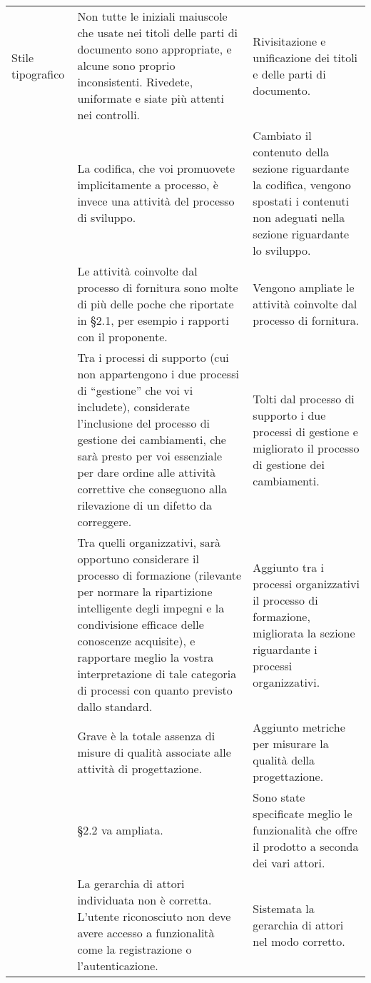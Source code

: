 {\begin{longtable}{ C{2.2cm} C{6cm} C{6cm}}
		Stile tipografico & Non tutte le iniziali maiuscole che usate nei titoli delle parti di documento sono appropriate, e alcune sono proprio inconsistenti. Rivedete, uniformate e siate più attenti nei controlli. & Rivisitazione e unificazione dei titoli e delle parti di documento. \\
		
		\NdP & La codifica, che voi promuovete implicitamente a processo, è invece una attività del processo di sviluppo. & Cambiato il contenuto della sezione riguardante la codifica, vengono spostati i contenuti non adeguati nella sezione riguardante lo sviluppo.\\
		
		\NdP & Le attività coinvolte dal processo di fornitura sono molte di più delle
		poche che riportate in §2.1, per esempio i rapporti con il proponente.& Vengono ampliate le attività coinvolte dal processo di fornitura.\\
		
		\NdP & Tra i processi di supporto (cui non appartengono i due processi di “gestione” che voi vi includete), considerate l’inclusione del processo di gestione dei cambiamenti, che sarà presto per voi essenziale per dare ordine alle attività correttive che conseguono alla rilevazione di un difetto da correggere.& Tolti dal processo di supporto i due processi di gestione e migliorato il processo di gestione dei cambiamenti. \\ 
		
		\NdP & Tra quelli organizzativi, sarà opportuno considerare il processo di formazione (rilevante per normare la ripartizione intelligente degli impegni e la condivisione efficace delle conoscenze acquisite), e rapportare meglio la vostra interpretazione di tale categoria di processi con quanto previsto dallo standard. & Aggiunto tra i processi organizzativi il processo di formazione, migliorata la sezione riguardante i processi organizzativi.\\
		
		\NdP & Grave è la totale assenza di misure di qualità associate alle attività di progettazione. & Aggiunto metriche per misurare la qualità della progettazione.\\
		
		\AdR & §2.2 va ampliata. & Sono state specificate meglio le funzionalità che offre il prodotto a seconda dei vari attori. \\
		
		\AdR & La gerarchia di attori individuata non è corretta. L’utente
		riconosciuto non deve avere accesso a funzionalità come la registrazione o
		l’autenticazione. & Sistemata la gerarchia di attori nel modo corretto.\\
		

\end{longtable}}
